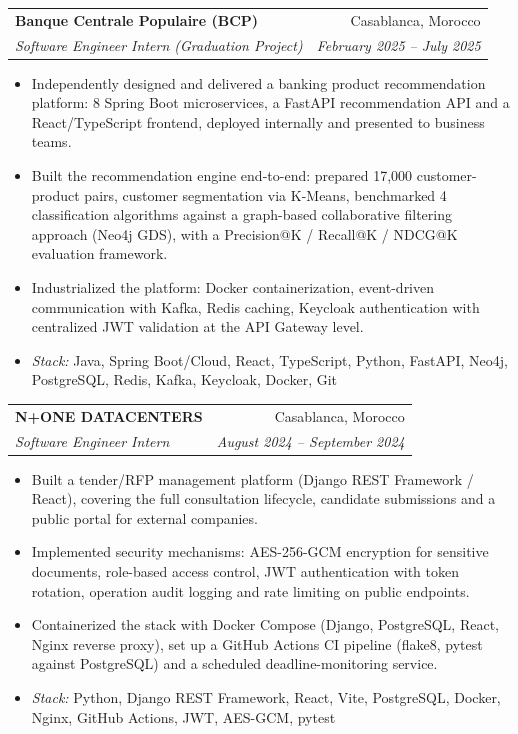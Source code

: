 \documentclass[letterpaper,11pt]{article}
\makeatletter
\newcommand{\resumeSubheading}[4]{
  \vspace{-1pt}\item
    \begin{tabular*}{0.97\textwidth}{l@{\extracolsep{\fill}}r}
      \textbf{#1} & #2 \\
      \textit{\small#3} & \textit{\small #4} \\
    \end{tabular*}\vspace{-5pt}
}
\newcommand{\resumeItemListStart}{\begin{itemize}}
\newcommand{\resumeItemListEnd}{\end{itemize}\vspace{-5pt}}
\makeatother
\begin{document}
\resumeSubheading
  {Banque Centrale Populaire (BCP)}{Casablanca, Morocco}
  {Software Engineer Intern (Graduation Project)}{February 2025 -- July 2025}
  \resumeItemListStart
    \item Independently designed and delivered a banking product recommendation platform:
      8 Spring Boot microservices, a FastAPI recommendation API and a React/TypeScript
      frontend, deployed internally and presented to business teams.
    \item Built the recommendation engine end-to-end: prepared 17,000 customer-product
      pairs, customer segmentation via K-Means, benchmarked 4 classification algorithms
      against a graph-based collaborative filtering approach (Neo4j GDS), with a
      Precision@K / Recall@K / NDCG@K evaluation framework.
    \item Industrialized the platform: Docker containerization, event-driven communication
      with Kafka, Redis caching, Keycloak authentication with centralized JWT validation
      at the API Gateway level.
    \item \textit{Stack:} Java, Spring Boot/Cloud, React, TypeScript, Python, FastAPI, Neo4j,
      PostgreSQL, Redis, Kafka, Keycloak, Docker, Git
  \resumeItemListEnd

\resumeSubheading
  {N+ONE DATACENTERS}{Casablanca, Morocco}
  {Software Engineer Intern}{August 2024 -- September 2024}
  \resumeItemListStart
    \item Built a tender/RFP management platform (Django REST Framework / React), covering
      the full consultation lifecycle, candidate submissions and a public portal for
      external companies.
    \item Implemented security mechanisms: AES-256-GCM encryption for sensitive documents,
      role-based access control, JWT authentication with token rotation, operation audit
      logging and rate limiting on public endpoints.
    \item Containerized the stack with Docker Compose (Django, PostgreSQL, React, Nginx
      reverse proxy), set up a GitHub Actions CI pipeline (flake8, pytest against
      PostgreSQL) and a scheduled deadline-monitoring service.
    \item \textit{Stack:} Python, Django REST Framework, React, Vite, PostgreSQL, Docker,
      Nginx, GitHub Actions, JWT, AES-GCM, pytest
  \resumeItemListEnd
\end{document}

